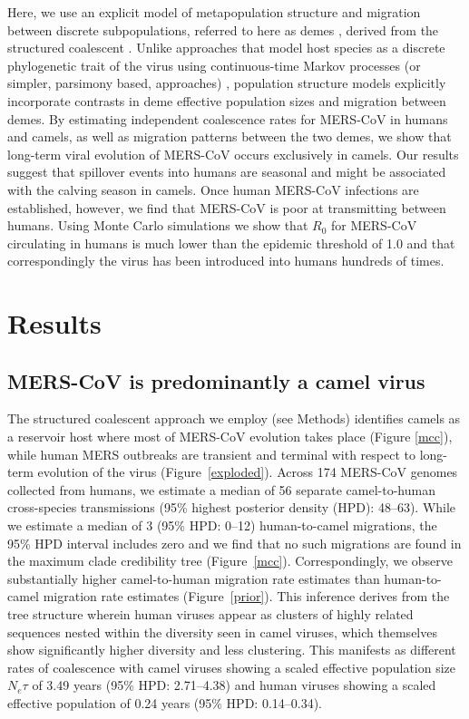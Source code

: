 \documentclass[11pt,oneside,letterpaper]{article}
\begin{document}
Here, we use an explicit model of metapopulation structure and migration between discrete subpopulations, referred to here as demes \citep{vaughan_efficient_2014}, derived from the structured coalescent \citep{notohara_structured_coalescent_1990}.
Unlike approaches that model host species as a discrete phylogenetic trait of the virus using continuous-time Markov processes (or simpler, parsimony based, approaches) \citep{faria_simultaneously_2013,lycett_h5n8_2016}, population structure models explicitly incorporate contrasts in deme effective population sizes and migration between demes.
By estimating independent coalescence rates for MERS-CoV in humans and camels, as well as migration patterns between the two demes, we show that long-term viral evolution of MERS-CoV occurs exclusively in camels.
Our results suggest that spillover events into humans are seasonal and might be associated with the calving season in camels.
Once human MERS-CoV infections are established, however, we find that MERS-CoV is poor at transmitting between humans.
Using Monte Carlo simulations we show that $R_{0}$ for MERS-CoV circulating in humans is much lower than the epidemic threshold of 1.0 and that correspondingly the virus has been introduced into humans hundreds of times.

\section*{Results}

\subsection*{MERS-CoV is predominantly a camel virus}

The structured coalescent approach we employ (see Methods) identifies camels as a reservoir host where most of MERS-CoV evolution takes place (Figure \ref{mcc}), while human MERS outbreaks are transient and terminal with respect to long-term evolution of the virus (Figure~\ref{exploded}).
Across 174 MERS-CoV genomes collected from humans, we estimate a median of 56 separate camel-to-human cross-species transmissions (95\% highest posterior density (HPD): 48--63).
While we estimate a median of 3 (95\% HPD: 0--12) human-to-camel migrations, the 95\% HPD interval includes zero and we find that no such migrations are found in the maximum clade credibility tree (Figure~\ref{mcc}).
Correspondingly, we observe substantially higher camel-to-human migration rate estimates than human-to-camel migration rate estimates (Figure~\ref{prior}).
This inference derives from the tree structure wherein human viruses appear as clusters of highly related sequences nested within the diversity seen in camel viruses, which themselves show significantly higher diversity and less clustering.
This manifests as different rates of coalescence with camel viruses showing a scaled effective population size $N_e \tau$ of 3.49 years (95\% HPD: 2.71--4.38) and human viruses showing a scaled effective population of 0.24 years (95\% HPD: 0.14--0.34).
\end{document}
